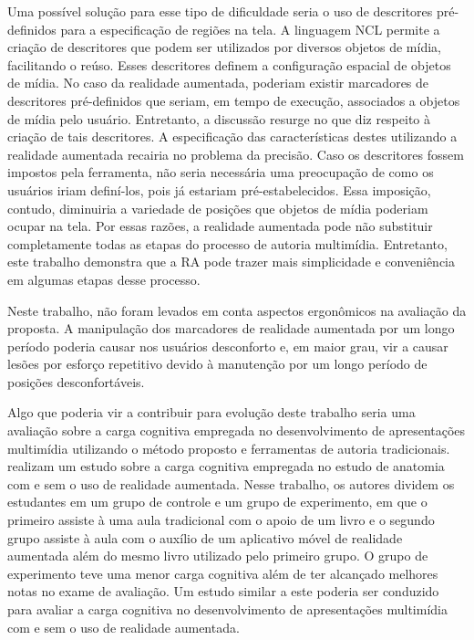 \documentclass[../main.tex]{subfiles}
\begin{document}
Uma possível solução para esse tipo de dificuldade seria o uso de descritores pré-definidos para a especificação de regiões na tela. A linguagem NCL permite a criação de descritores que podem ser utilizados por diversos objetos de mídia, facilitando o reúso. Esses descritores definem a configuração espacial de objetos de mídia. No caso da realidade aumentada, poderiam existir marcadores de descritores pré-definidos que seriam, em tempo de execução, associados a objetos de mídia pelo usuário. Entretanto, a discussão resurge no que diz respeito à criação de tais descritores. A especificação das características destes utilizando a realidade aumentada recairia no problema da precisão. Caso os descritores fossem impostos pela ferramenta, não seria necessária uma preocupação de como os usuários iriam definí-los, pois já estariam pré-estabelecidos. Essa imposição, contudo, diminuiria a variedade de posições que objetos de mídia poderiam ocupar na tela. Por essas razões, a realidade aumentada pode não substituir completamente todas as etapas do processo de autoria multimídia. Entretanto, este trabalho demonstra que a RA pode trazer mais simplicidade e conveniência em algumas etapas desse processo.

Neste trabalho, não foram levados em conta aspectos ergonômicos na avaliação da proposta. A manipulação dos marcadores de realidade aumentada por um longo período poderia causar nos usuários desconforto e, em maior grau, vir a causar lesões por esforço repetitivo devido à manutenção por um longo período de posições desconfortáveis.

Algo que poderia vir a contribuir para evolução deste trabalho seria uma avaliação sobre a carga cognitiva empregada no desenvolvimento de apresentações multimídia utilizando o método proposto e ferramentas de autoria tradicionais.  realizam um estudo sobre a carga cognitiva empregada no estudo de anatomia com e sem o uso de realidade aumentada. Nesse trabalho, os autores dividem os estudantes em um grupo de controle e um grupo de experimento, em que o primeiro assiste à uma aula tradicional com o apoio de um livro e o segundo grupo assiste à aula com o auxílio de um aplicativo móvel de realidade aumentada além do mesmo livro utilizado pelo primeiro grupo. O grupo de experimento teve uma menor carga cognitiva além de ter alcançado melhores notas no exame de avaliação. Um estudo similar a este poderia ser conduzido para avaliar a carga cognitiva no desenvolvimento de apresentações multimídia com e sem o uso de realidade aumentada.
\end{document}
